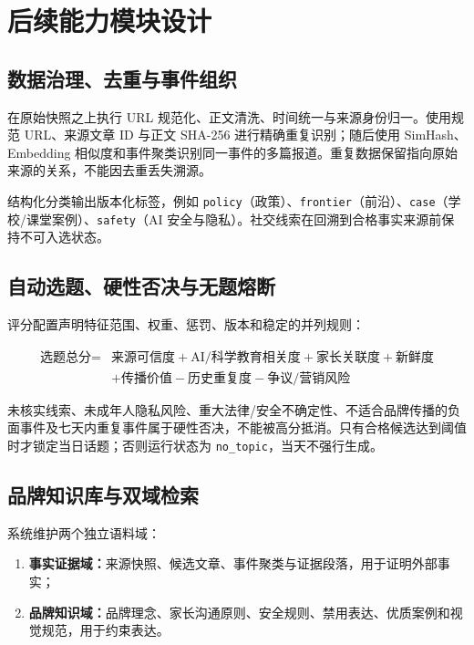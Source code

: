 \documentclass[UTF8,11pt,a4paper,fontset=none]{ctexart}
\begin{document}
\section{后续能力模块设计}

\subsection{数据治理、去重与事件组织}

在原始快照之上执行 URL 规范化、正文清洗、时间统一与来源身份归一。使用规范 URL、来源文章 ID 与正文 SHA-256 进行精确重复识别；随后使用 SimHash、Embedding 相似度和事件聚类识别同一事件的多篇报道。重复数据保留指向原始来源的关系，不能因去重丢失溯源。

结构化分类输出版本化标签，例如 \texttt{policy}（政策）、\texttt{frontier}（前沿）、\texttt{case}（学校/课堂案例）、\texttt{safety}（AI 安全与隐私）。社交线索在回溯到合格事实来源前保持不可入选状态。

\subsection{自动选题、硬性否决与无题熔断}

评分配置声明特征范围、权重、惩罚、版本和稳定的并列规则：

\begin{equation*}
\begin{aligned}
\text{选题总分} ={} & \text{来源可信度} + \text{AI/科学教育相关度} + \text{家长关联度} + \text{新鲜度} \\
& + \text{传播价值} - \text{历史重复度} - \text{争议/营销风险}
\end{aligned}
\end{equation*}

未核实线索、未成年人隐私风险、重大法律/安全不确定性、不适合品牌传播的负面事件及七天内重复事件属于硬性否决，不能被高分抵消。只有合格候选达到阈值时才锁定当日话题；否则运行状态为 \texttt{no\_topic}，当天不强行生成。

\subsection{品牌知识库与双域检索}

系统维护两个独立语料域：
\begin{enumerate}[leftmargin=2em,itemsep=0.25em]
  \item \textbf{事实证据域：}来源快照、候选文章、事件聚类与证据段落，用于证明外部事实；
  \item \textbf{品牌知识域：}品牌理念、家长沟通原则、安全规则、禁用表达、优质案例和视觉规范，用于约束表达。
\end{enumerate}
\end{document}

